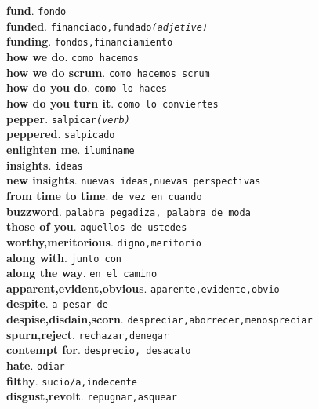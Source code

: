 \documentclass[twocolumn]{article}
\begin{document}
	\textsf{\textbf{fund}}. \texttt{fondo}\\
	\textsf{\textbf{funded}}. \texttt{financiado,fundado{\scriptsize \textsl{(adjetive)}}}\\
	\textsf{\textbf{funding}}. \texttt{fondos,financiamiento}\\
	\textsf{\textbf{how we do}}. \texttt{como hacemos}\\
	\textsf{\textbf{how we do scrum}}. \texttt{como hacemos scrum}\\
	\textsf{\textbf{how do you do}}. \texttt{como lo haces}\\
	\textsf{\textbf{how do you turn it}}. \texttt{como lo conviertes}\\
	\textsf{\textbf{pepper}}. \texttt{salpicar{\scriptsize \textsl{(verb)}}}\\
	\textsf{\textbf{peppered}}. \texttt{salpicado}\\
	\textsf{\textbf{enlighten me}}. \texttt{iluminame}\\
	\textsf{\textbf{insights}}. \texttt{ideas}\\
	\textsf{\textbf{new insights}}. \texttt{nuevas ideas,nuevas perspectivas}\\
	\textsf{\textbf{from time to time}}. \texttt{de vez en cuando}\\
	\textsf{\textbf{buzzword}}. \texttt{palabra pegadiza, palabra de moda}\\
	\textsf{\textbf{those of you}}. \texttt{aquellos de ustedes}\\
	\textsf{\textbf{worthy,meritorious}}. \texttt{digno,meritorio}\\
	\textsf{\textbf{along with}}. \texttt{junto con}\\
	\textsf{\textbf{along the way}}. \texttt{en el camino}\\
	\textsf{\textbf{apparent,evident,obvious}}. \texttt{aparente,evidente,obvio}\\
	\textsf{\textbf{despite}}. \texttt{a pesar de}\\
	\textsf{\textbf{despise,disdain,scorn}}. \texttt{despreciar,aborrecer,menospreciar}\\
	\textsf{\textbf{spurn,reject}}. \texttt{rechazar,denegar}\\
	\textsf{\textbf{contempt for}}. \texttt{desprecio, desacato}\\
	\textsf{\textbf{hate}}. \texttt{odiar}\\
	\textsf{\textbf{filthy}}. \texttt{sucio/a,indecente}\\
	\textsf{\textbf{disgust,revolt}}. \texttt{repugnar,asquear}\\
\end{document}
